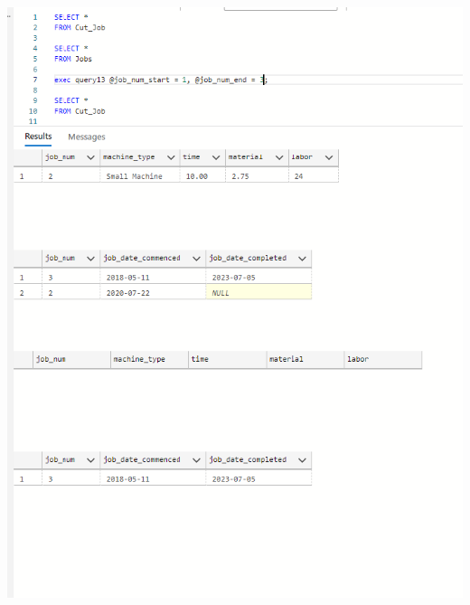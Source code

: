 \documentclass[11pt]{article}
\begin{document}
\begin{enumerate}
\includegraphics[width = \textwidth]{cutdelete3.png}


\end{enumerate}
\end{document}
